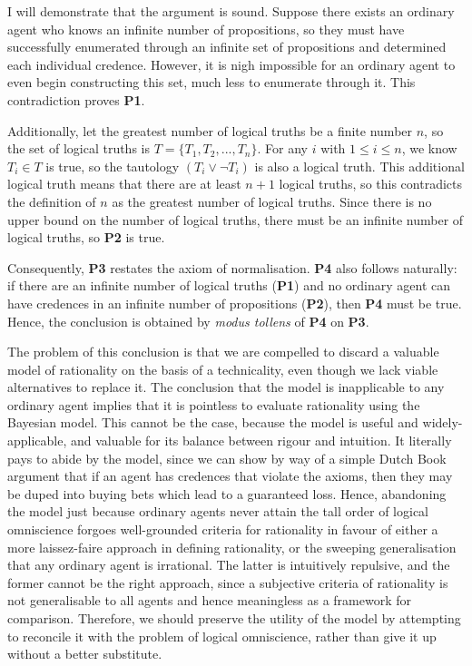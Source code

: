 \documentclass[12pt]{article}
\begin{document}
I will demonstrate that the argument is sound. Suppose there exists an ordinary agent who knows an infinite number of propositions, so they must have successfully enumerated through an infinite set of propositions and determined each individual credence. However, it is nigh impossible for an ordinary agent to even begin constructing this set, much less to enumerate through it. This contradiction proves \textbf{P1}.

Additionally, let the greatest number of logical truths be a finite number $n$, so the set of logical truths is $T=\{T_1,T_2,...,T_n\}$. For any $i$ with $1\leq i\leq n$, we know $T_i\in T$ is true, so the tautology $(T_i\lor\lnot T_i)$ is also a logical truth. This additional logical truth means that there are at least $n+1$ logical truths, so this contradicts the definition of $n$ as the greatest number of logical truths. Since there is no upper bound on the number of logical truths, there must be an infinite number of logical truths, so \textbf{P2} is true.

Consequently, \textbf{P3} restates the axiom of normalisation. \textbf{P4} also follows naturally: if there are an infinite number of logical truths (\textbf{P1}) and no ordinary agent can have credences in an infinite number of propositions (\textbf{P2}), then \textbf{P4} must be true. Hence, the conclusion is obtained by \textit{modus tollens} of \textbf{P4} on \textbf{P3}.

The problem of this conclusion is that we are compelled to discard a valuable model of rationality on the basis of a technicality, even though we lack viable alternatives to replace it. The conclusion that the model is inapplicable to any ordinary agent implies that it is pointless to evaluate rationality using the Bayesian model. This cannot be the case, because the model is useful and widely-applicable, and valuable for its balance between rigour and intuition. It literally pays to abide by the model, since we can show by way of a simple Dutch Book argument that if an agent has credences that violate the axioms, then they may be duped into buying bets which lead to a guaranteed loss.\autocite[44]{bdrc} Hence, abandoning the model just because ordinary agents never attain the tall order of logical omniscience forgoes well-grounded criteria for rationality in favour of either a more laissez-faire approach in defining rationality, or the sweeping generalisation that any ordinary agent is irrational. The latter is intuitively repulsive, and the former cannot be the right approach, since a subjective criteria of rationality is not generalisable to all agents and hence meaningless as a framework for comparison. Therefore, we should preserve the utility of the model by attempting to reconcile it with the problem of logical omniscience, rather than give it up without a better substitute.
\end{document}
